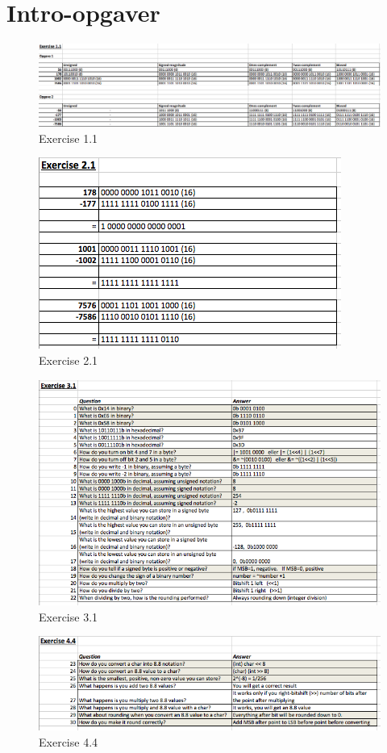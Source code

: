 \chapter{Intro-opgaver}

\begin{figure}[h!]
\centering
\includegraphics[scale=0.6]{figs/Ex1.1.png}
\caption{Exercise 1.1}
\label{fig:Ex1.1}
\end{figure}

\begin{figure}[h!]
\centering
\includegraphics[scale=0.6]{figs/Ex2.1.png}
\caption{Exercise 2.1}
\label{fig:Ex2.1}
\end{figure}

\begin{figure}[h!]
\centering
\includegraphics[scale=0.6]{figs/Ex3.1.png}
\caption{Exercise 3.1}
\label{fig:Ex3.1}
\end{figure}

\begin{figure}[h!]
\centering
\includegraphics[scale=0.6]{figs/Ex4.4.png}
\caption{Exercise 4.4}
\label{fig:Ex4.4}
\end{figure}
